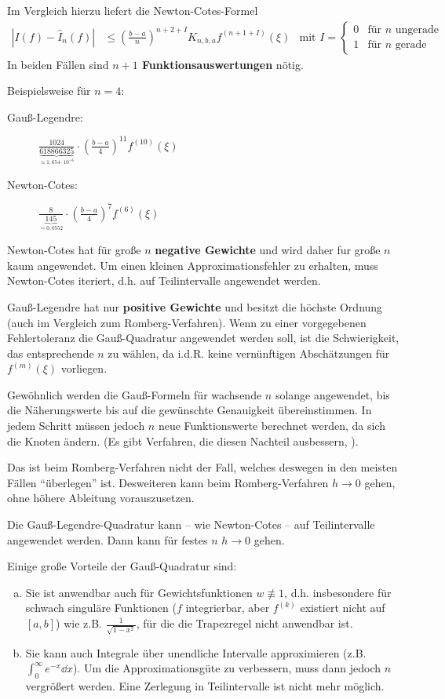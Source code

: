 Im Vergleich hierzu liefert die Newton-Cotes-Formel
\begin{align*}
  \left| I(f)-\hat{I}_n(f) \right| 
  &\leq \left(\frac{b-a}{n} \right)^{n+2+I} K_{n,b,a}f^{(n+1+I)}(\xi)
  & \text{mit } I=\begin{cases}
    0&\text{für $n$ ungerade}\\
    1&\text{für $n$ gerade}
  \end{cases}
\end{align*}
In beiden Fällen sind \textbf{$n+1$ Funktionsauswertungen} nötig.

Beispielsweise für $n=4$:
\begin{description}
\item[Gauß-Legendre:] 
  $\frac{1024}{\underbrace{618866325}_{\approx 1,654\cdot 10^{-6}}}
  \cdot \left(\frac{b-a}{4} \right)^{11}f^{(10)}(\xi)$
\item[Newton-Cotes:]
  $\frac{8}{\underbrace{145}_{=0,0552}}
  \cdot \left(\frac{b-a}{4} \right)^{7}f^{(6)}(\xi)$
\end{description}
Newton-Cotes hat für große $n$ \textbf{negative Gewichte} und wird
daher fur große $n$ kaum angewendet. Um einen kleinen
Approximationsfehler zu erhalten, muss Newton-Cotes iteriert,
d.h. auf Teilintervalle angewendet werden.

Gauß-Legendre hat nur \textbf{positive Gewichte} und besitzt die
höchste Ordnung (auch im Vergleich zum Romberg-Verfahren).
Wenn zu einer vorgegebenen Fehlertoleranz die
Gauß-Quadratur angewendet werden soll, ist die Schwierigkeit,
das entsprechende $n$ zu wählen, da i.d.R. keine vernünftigen
Abschätzungen für $f^(m)(\xi)$ vorliegen.

Gewöhnlich werden die Gauß-Formeln für wachsende $n$ solange
angewendet, bis die Näherungswerte bis auf die gewünschte
Genauigkeit übereinstimmen.
In jedem Schritt müssen jedoch $n$ neue Funktionswerte
berechnet werden, da sich die Knoten ändern. (Es gibt
Verfahren, die diesen Nachteil ausbessern, \cite[siehe][]{stoer}).

Das ist beim Romberg-Verfahren nicht der Fall, welches
deswegen in den meisten Fällen \enquote{überlegen} ist. 
Desweiteren kann beim Romberg-Verfahren $h\to 0$ gehen,
ohne höhere Ableitung vorauszusetzen.

Die Gauß-Legendre-Quadratur kann – wie Newton-Cotes – auf
Teilintervalle angewendet werden.
Dann kann für festes $n$ $h\to 0$ gehen.

Einige große Vorteile der Gauß-Quadratur sind:
\begin{enumerate}[a)]
\item Sie ist anwendbar auch für Gewichtsfunktionen $w\not\equiv 1$,
  d.h. insbesondere für schwach singuläre Funktionen
($f$ integrierbar, aber $f^(k)$ existiert nicht auf $[a,b]$)
wie z.B. $\frac{1}{\sqrt{1-x^2}}$, 
für die die Trapezregel nicht anwendbar ist. 
\item Sie kann auch Integrale über unendliche Intervalle
  approximieren (z.B. $\int_0^\infty e^{-x}\dd x$). 
  Um die Approximationsgüte zu verbessern, 
  muss dann jedoch $n$ vergrößert werden. 
  Eine Zerlegung in Teilintervalle ist nicht mehr möglich.
\end{enumerate}

